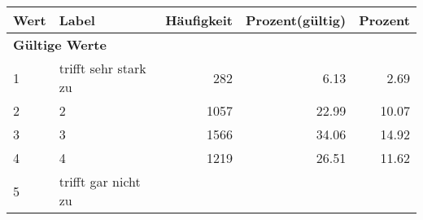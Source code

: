      \begin{longtable}{lXrrr}
     \toprule
     \textbf{Wert} & \textbf{Label} & \textbf{Häufigkeit} & \textbf{Prozent(gültig)} & \textbf{Prozent} \\
     \endhead
     \midrule
     \multicolumn{5}{l}{\textbf{Gültige Werte}}\\

     1 &
     \multicolumn{1}{X}{ trifft sehr stark zu   } &


       \num{282} &
       \num[round-mode=places,round-precision=2]{6.13} &
         \num[round-mode=places,round-precision=2]{2.69} \\

     2 &
     \multicolumn{1}{X}{ 2   } &


       \num{1057} &
       \num[round-mode=places,round-precision=2]{22.99} &
         \num[round-mode=places,round-precision=2]{10.07} \\

     3 &
     \multicolumn{1}{X}{ 3   } &


       \num{1566} &
       \num[round-mode=places,round-precision=2]{34.06} &
         \num[round-mode=places,round-precision=2]{14.92} \\

     4 &
     \multicolumn{1}{X}{ 4   } &


       \num{1219} &
       \num[round-mode=places,round-precision=2]{26.51} &
         \num[round-mode=places,round-precision=2]{11.62} \\

     5 &
     \multicolumn{1}{X}{ trifft gar nicht zu   } &



\end{longtable}
